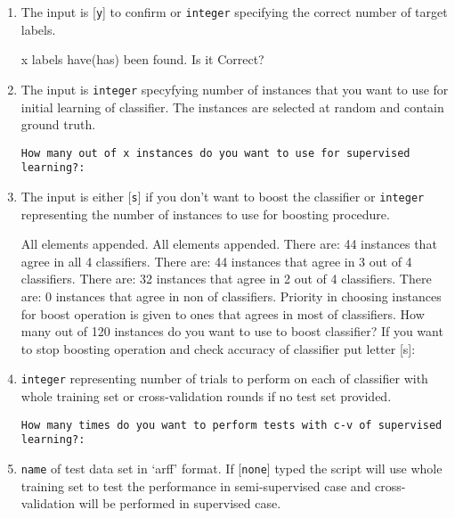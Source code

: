 \begin{enumerate}
\item The input is [\texttt{y}] to confirm or \texttt{integer} specifying the correct number of target labels.

\begin{spverbatim}
x labels have(has) been found. Is it Correct?

\end{spverbatim}

\item The input is \texttt{integer} specyfying number of instances that you want to use for initial learning of classifier. The instances are selected at random and contain ground truth.

\texttt{How many out of x instances do you want to use for supervised learning?:}

\item The input is either [\texttt{s}] if you don't want to boost the classifier or \texttt{integer} representing the number of instances to use for boosting procedure.

\begin{spverbatim}
All elements appended.
All elements appended.
There are: 44 instances that agree in all 4 classifiers.
There are: 44 instances that agree in 3 out of 4 classifiers.
There are: 32 instances that agree in 2 out of 4 classifiers.
There are: 0 instances that agree in non of classifiers.
Priority in choosing instances for boost operation is given to ones that agrees in most of classifiers.
How many out of 120 instances do you want to use to boost classifier?
If you want to stop boosting operation and check accuracy of classifier put letter [s]: 
\end{spverbatim}

\item \texttt{integer} representing number of trials to perform on each of classifier with whole training set or cross-validation rounds if no test set provided. 

\texttt{How many times do you want to perform tests with c-v of supervised learning?:}

\item \texttt{name} of test data set in `arff' format. If [\texttt{none}] typed the script will use whole training set to test the performance in semi-supervised case and cross-validation will be performed in supervised case.


\end{enumerate}
